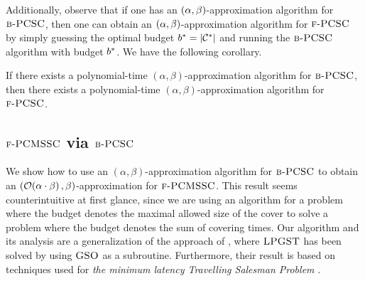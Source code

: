 Additionally, observe that if one has an $\mathopen{}\left( \alpha, \beta \right)$-approximation algorithm for $\textup{\textsc{b-PCSC}}$, then one can obtain an $\mathopen{}\left( \alpha, \beta \right)$-approximation algorithm for $\textup{\textsc{f-PCSC}}$ by simply guessing the optimal budget $b^*=\mathopen{}\left| \mathcal{C}^{*} \right|$ and running the $\textup{\textsc{b-PCSC}}$ algorithm with budget $b^*$. We have the following corollary.
\begin{corollary}\label{cor:BPCSC-to-PCSC}
    If there exists a polynomial-time $(\alpha,\beta)$-approximation algorithm for $\textup{\textsc{b-PCSC}}$, then there exists a polynomial-time $(\alpha,\beta)$-approximation algorithm for $\textup{\textsc{f-PCSC}}$.
\end{corollary}


\subsection{$\textup{\textsc{f-PCMSSC}}$ via $\textup{\textsc{b-PCSC}}$} \label{subsection:PCMSSC}
We show how to use an $(\alpha,\beta)$-approximation algorithm for $\textup{\textsc{b-PCSC}}$ to obtain an $\mathopen{}\left( \mathcal{O}\mathopen{}\left( \alpha\cdot\beta \right), \beta \right)$-approximation for $\textup{\textsc{f-PCMSSC}}$. This result seems counterintuitive at first glance, since we are using an algorithm for a problem where the budget denotes the maximal allowed size of the cover to solve a problem where the budget denotes the sum of covering times. Our algorithm and its analysis are a generalization of the approach of \cite{ApproxAlgsForOptDTsAndAdapTSPProblems}, where $\textup{\textsc{LPGST}}$ has been solved by using $\textup{\textsc{GSO}}$ as a subroutine. Furthermore, their result is based on techniques used for \textit{the minimum latency Travelling Salesman Problem} \cite{PathsTreesMinimumLatencyTours,KTravelingRepairmenProblem}.

